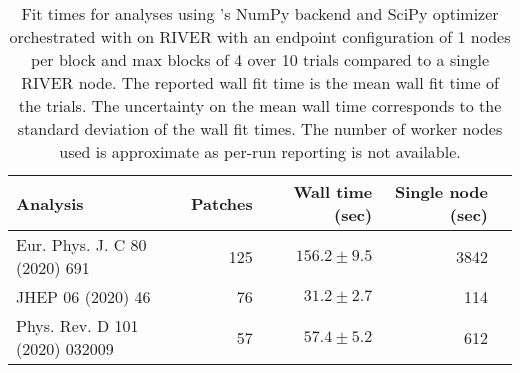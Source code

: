 \begin{table}[htpb]
\centering
\caption{Fit times for analyses using \pyhf{}'s NumPy backend and SciPy optimizer orchestrated with \funcX{} on RIVER with an endpoint configuration of 1 nodes per block and max blocks of 4 over 10 trials compared to a single RIVER node. The reported wall fit time is the mean wall fit time of the trials. The uncertainty on the mean wall time corresponds to the standard deviation of the wall fit times. The number of worker nodes used is approximate as per-run reporting is not available.}
\label{table:performance}
\begin{tabular}{@{}lrrrr@{}}
\toprule
                      Analysis & Patches & Wall time (sec) & Single node (sec) \\
\midrule
 Eur. Phys. J. C 80 (2020) 691 &     125 &   $156.2\pm9.5$ &              3842 \\
             JHEP 06 (2020) 46 &      76 &    $31.2\pm2.7$ &               114 \\
Phys. Rev. D 101 (2020) 032009 &      57 &    $57.4\pm5.2$ &               612 \\
\bottomrule
\end{tabular}
\end{table}
